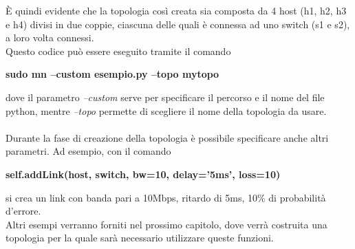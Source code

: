 È quindi evidente che la topologia così creata sia composta da 4 host (h1, h2, h3 e h4) divisi in due coppie, ciascuna delle quali è connessa ad uno switch (s1 e s2), a loro volta connessi.\\
Questo codice può essere eseguito tramite il comando
\begin{center}
	\textbf{sudo mn --custom esempio.py --topo mytopo}
\end{center}
dove il parametro \textit{--custom} serve per specificare il percorso e il nome del file python, mentre \textit{--topo} permette di scegliere il nome della topologia da usare.\\\\
Durante la fase di creazione della topologia è possibile specificare anche altri parametri. Ad esempio, con il comando
\begin{center}
	\textbf{self.addLink(host, switch,
bw=10, delay='5ms', loss=10)}
\end{center}
si crea un link con banda pari a 10Mbps, ritardo di 5ms, 10\% di probabilità d'errore.\\
 Altri esempi verranno forniti nel prossimo capitolo, dove verrà costruita una topologia per la quale sarà necessario utilizzare queste funzioni. \cite{mn3}

